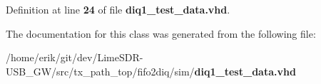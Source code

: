 Definition at line {\bf 24} of file {\bf diq1\+\_\+test\+\_\+data.\+vhd}.



The documentation for this class was generated from the following file\+:\begin{DoxyCompactItemize}
\item 
/home/erik/git/dev/\+Lime\+S\+D\+R-\/\+U\+S\+B\+\_\+\+G\+W/src/tx\+\_\+path\+\_\+top/fifo2diq/sim/{\bf diq1\+\_\+test\+\_\+data.\+vhd}\end{DoxyCompactItemize}
